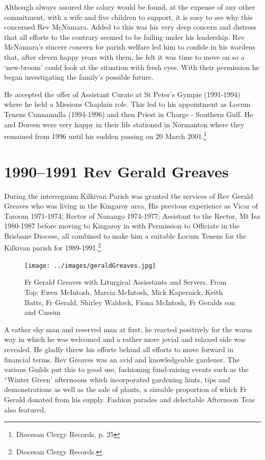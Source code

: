 Although always assured the salary would be found, at the expense of any other commitment, with a wife and five children to support, it is easy to see why this concerned Rev McNamara. Added to this was his very deep concern and distress that all efforts to the contrary seemed to be failing under his leadership. Rev McNamara's sincere concern for parish welfare led him to confide in his wardens that, after eleven happy years with them, he felt it was time to move on so a `new-broom' could look at the situation with fresh eyes. With their permission he began investigating the family's possible future.



He accepted the offer of Assistant Curate at St Peter's Gympie (1991-1994) where he held a Missions Chaplain role. This led to his appointment as Locum Tenens Cunnamulla (1994-1996) and then Priest in Charge - Southern Gulf. He and Doreen were very happy in their life stationed in Normanton where they remained from 1996 until his sudden passing on 20 March 2001.\footnote{Diocesan Clergy Records, p. 25}


\section{1990--1991 Rev Gerald Greaves}



During the interregnum Kilkivan Parish was granted the services of Rev Gerald Greaves who was living in the Kingaroy area. His previous experience as Vicar of Taroom 1971-1974; Rector of Nanango 1974-1977; Assistant to the Rector, Mt Isa 1980-1987 before moving to Kingaroy in with Permission to Officiate in the Brisbane Diocese, all combined to make him a suitable Locum Tenens for the Kilkivan parish for 1989-1991.\footnote{Diocesan Clergy Records.}








\begin{figure}
\begin{center}
\texttt{[image: ../images/geraldGreaves.jpg]}
\caption{Fr Gerald Greaves with Liturgical Assisstants and Servers. From Top: Ewen McIntosh, Marcia McIntosh, Mick Kapernick, Keith Batts, Fr Gerald, Shirley Waldock, Fiona McIntosh, Fr Geralds son and Cassim}
\end{center}
\end{figure}


A rather shy man and reserved man at first, he reacted positively for the warm way in which he was welcomed and a rather more jovial and relaxed side was revealed. He gladly threw his efforts behind all efforts to move forward in financial terms. Rev Greaves was an avid and knowledgeable gardener. The various Guilds put this to good use, fashioning fund-raising events such as the ``Winter Green' afternoons which incorporated gardening hints, tips and demonstrations as well as the sale of plants, a sizeable proportion of which Fr Gerald donated from his supply. Fashion parades and delectable Afternoon Teas also featured.



